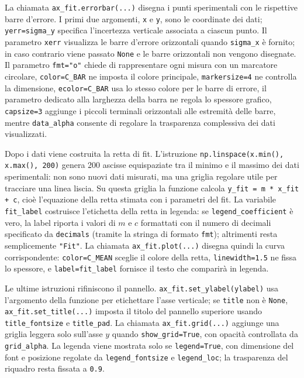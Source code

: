 La chiamata \texttt{ax\_fit.errorbar(...)} disegna i punti sperimentali con le rispettive barre d'errore. I primi due argomenti, \texttt{x} e \texttt{y}, sono le coordinate dei dati; \texttt{yerr=sigma\_y} specifica l'incertezza verticale associata a ciascun punto. Il parametro \texttt{xerr} visualizza le barre d'errore orizzontali quando \texttt{sigma\_x} \`e fornito; in caso contrario viene passato \texttt{None} e le barre orizzontali non vengono disegnate. Il parametro \texttt{fmt="o"} chiede di rappresentare ogni misura con un marcatore circolare, \texttt{color=C\_BAR} ne imposta il colore principale, \texttt{markersize=4} ne controlla la dimensione, \texttt{ecolor=C\_BAR} usa lo stesso colore per le barre di errore, il parametro dedicato alla larghezza della barra ne regola lo spessore grafico, \texttt{capsize=3} aggiunge i piccoli terminali orizzontali alle estremità delle barre, mentre \texttt{data\_alpha} consente di regolare la trasparenza complessiva dei dati visualizzati.

Dopo i dati viene costruita la retta di fit. L'istruzione \texttt{np.linspace(x.min(), x.max(), 200)} genera 200 ascisse equispaziate tra il minimo e il massimo dei dati sperimentali: non sono nuovi dati misurati, ma una griglia regolare utile per tracciare una linea liscia. Su questa griglia la funzione calcola \texttt{y\_fit = m * x\_fit + c}, cioè l'equazione della retta stimata con i parametri del fit. La variabile \texttt{fit\_label} costruisce l'etichetta della retta in legenda: se \texttt{legend\_coefficient} è vero, la label riporta i valori di $m$ e $c$ formattati con il numero di decimali specificato da \texttt{decimals} (tramite la stringa di formato \texttt{fmt}); altrimenti resta semplicemente \texttt{"Fit"}. La chiamata \texttt{ax\_fit.plot(...)} disegna quindi la curva corrispondente: \texttt{color=C\_MEAN} sceglie il colore della retta, \texttt{linewidth=1.5} ne fissa lo spessore, e \texttt{label=fit\_label} fornisce il testo che comparirà in legenda.

Le ultime istruzioni rifiniscono il pannello. \texttt{ax\_fit.set\_ylabel(ylabel)} usa l'argomento della funzione per etichettare l'asse verticale; se \texttt{title} non è \texttt{None}, \texttt{ax\_fit.set\_title(...)} imposta il titolo del pannello superiore usando \texttt{title\_fontsize} e \texttt{title\_pad}. La chiamata \texttt{ax\_fit.grid(...)} aggiunge una griglia leggera solo sull'asse \(y\) quando \texttt{show\_grid=True}, con opacità controllata da \texttt{grid\_alpha}. La legenda viene mostrata solo se \texttt{legend=True}, con dimensione del font e posizione regolate da \texttt{legend\_fontsize} e \texttt{legend\_loc}; la trasparenza del riquadro resta fissata a \texttt{0.9}.

